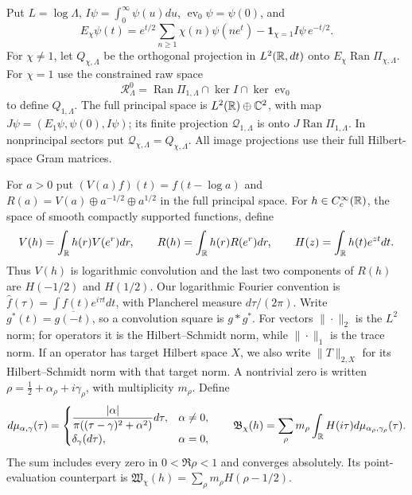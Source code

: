 Put $L=\log\Lambda$, $I\psi=\int_0^\infty\psi(u)du$,
$\operatorname{ev}_0\psi=\psi(0)$, and
\[
 E_\chi\psi(t)=e^{t/2}\sum_{n\geq1}\chi(n)\psi(ne^t)
                  -\mathbf1_{\chi=1}I\psi\,e^{-t/2}.
\]
For $\chi\ne1$, let $Q_{\chi,\Lambda}$ be the orthogonal
projection in $L^2(\mathbb R,dt)$ onto
$E_\chi\operatorname{Ran}\Pi_{\chi,\Lambda}$.
For $\chi=1$ use the constrained raw space
\[
 \mathcal R_\Lambda^0=\operatorname{Ran}\Pi_{1,\Lambda}
                  \cap\ker I\cap\ker\operatorname{ev}_0
\]
to define $Q_{1,\Lambda}$. The full principal space is
$L^2(\mathbb R)\oplus\mathbb C^2$, with map
$J\psi=(E_1\psi,\psi(0),I\psi)$; its finite projection
$\mathcal Q_{1,\Lambda}$ is onto
$J\operatorname{Ran}\Pi_{1,\Lambda}$.
In nonprincipal sectors put $\mathcal Q_{\chi,\Lambda}=Q_{\chi,\Lambda}$.
All image projections use their full Hilbert-space Gram matrices.

For $a>0$ put $(V(a)f)(t)=f(t-\log a)$ and
$R(a)=V(a)\oplus a^{-1/2}\oplus a^{1/2}$ in the full principal
space. For $h\in C_c^\infty(\mathbb R)$, the space of smooth compactly
supported functions, define
\[
 V(h)=\int_\mathbb R h(r)V(e^r)dr,\qquad
 R(h)=\int_\mathbb R h(r)R(e^r)dr,\qquad
 H(z)=\int_\mathbb R h(t)e^{zt}dt.
\]
Thus $V(h)$ is logarithmic convolution and the last two components of
$R(h)$ are $H(-1/2)$ and $H(1/2)$. Our logarithmic Fourier convention
is $\widehat f(\tau)=\int f(t)e^{i\tau t}dt$, with Plancherel
measure $d\tau/(2\pi)$. Write $g^*(t)=\overline{g(-t)}$, so a
convolution square is $g*g^*$. For vectors $\|\cdot\|_2$ is the
$L^2$ norm; for operators it is the Hilbert--Schmidt norm, while
$\|\cdot\|_1$ is the trace norm. If an operator has target Hilbert
space $X$, we also write $\|T\|_{2,X}$ for its Hilbert--Schmidt
norm with that target norm. A nontrivial zero is written
$\rho=\tfrac12+\alpha_\rho+i\gamma_\rho$, with multiplicity
$m_\rho$. Define
\begin{equation}\label{eq:intro-harmonic-measure}
 d\mu_{\alpha,\gamma}(\tau)=
 \begin{cases}
 \displaystyle\frac{|\alpha|}{\pi((\tau-\gamma)^2+\alpha^2)}d\tau,
                                      &\alpha\ne0,\\
 \delta_\gamma(d\tau),&\alpha=0,
 \end{cases}
 \qquad
 \mathfrak B_\chi(h)=\sum_\rho m_\rho
                 \int_\mathbb R H(i\tau)d\mu_{\alpha_\rho,\gamma_\rho}(\tau).
\end{equation}
The sum includes every zero in $0<\Re\rho<1$ and converges
absolutely. Its point-evaluation counterpart is
$\mathfrak W_\chi(h)=\sum_\rho m_\rho H(\rho-1/2)$.

